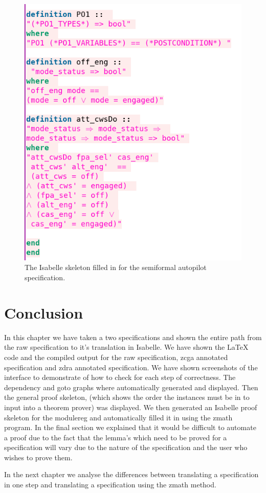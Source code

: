 \begin{figure}[H]
\begin{minipage}{0.45\textwidth}
     \includegraphics[width=\linewidth]{Figures/fullexample/sfisabellefill2.png}
     \end{minipage}
     \caption{The Isabelle skeleton filled in for the semiformal autopilot specification. \label{fig:sfisabelleskeletonfill}}
\end{figure}

\section{Conclusion}
In this chapter we have taken a two specifications and shown the entire path
from the raw specification to it's translation in Isabelle. We have shown the
\LaTeX{} code and the compiled output for the raw specification, \gls{zcga}
annotated specification and \gls{zdra} annotated specification. We have shown
screenshots of the interface to demonstrate of how to check for each step of
correctness. The dependency and goto graphs where automatically generated and
displayed. Then the general proof skeleton, (which shows the order the instances
must be in to input into a theorem prover) was displayed. We then generated an
Isabelle proof skeleton for the modulereg and automatically filled it in
using the \gls{zmath} program. In the final section we explained that it would
be difficult to automate a proof due to the fact that the lemma's which need to
be proved for a specification will vary due to the nature of the specification
and the user who wishes to prove them. 

In the next chapter we analyse the differences between translating a
specification in one step and translating a specification using the \gls{zmath}
method.